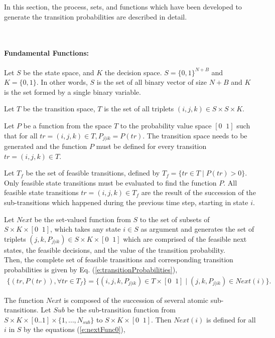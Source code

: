 \documentclass[letterpaper]{article}
\begin{document}
\iffalse
In this section, the process, sets, and functions which have been developed to generate the transition probabilities are described in detail.


\\

\paragraph{Fundamental Functions:}

Let $S$ be the state space, and $K$ the decision space. $S = \{0,1\}^{N+B}$ and $K = \{0,1\}$. In other words, $S$ is the set of all binary vector of size $N+B$ and $K$ is the set formed by a single binary variable.

Let $T$ be the transition space, $T$ is the set of all triplets $(i,j,k) \in S\times S \times K$.

Let $P$ be a function from the space $T$ to the probability value space $[0\;\;1]$ such that for all $tr=(i,j,k) \in T, P_{j|ik} = P(tr)$.
The transition space needs to be generated and the function $P$ must be defined for every transition $tr=(i,j,k) \in T$.

Let $T_f$ be the set of feasible transitions, defined by $T_f = \{tr \in T \mid P(tr)>0\}$. Only feasible state transitions must be evaluated to find the function $P$. All feasible state transitions $tr=(i,j,k) \in T_f$ are the result of the succession of the sub-transitions which happened during the previous time step, starting in state $i$.

Let $Next$ be the set-valued function from $S$ to the set of subsets of $S \times K \times [0 \;\; 1]$, which takes any state $i \in S$ as argument and 
generates the set of triplets $(j,k,P_{j|ik}) \in S \times K \times [0 \;\; 1]$  which are comprised of the feasible next states,
 the feasible decisions, and the value of the transition probability.\\

Then, the complete set of feasible transitions and corresponding transition probabilities is given by Eq. (\ref{e:transitionProbabilities}),
\begin{eqnarray}
  \label{e:transitionProbabilities}
 \{(tr,P(tr)), \forall tr \in T_f\} = \{(i,j,k,P_{j|ik}) \in T \times [0\;\;1] \mid  (j,k,P_{j|ik}) \in Next(i)\}.
\end{eqnarray}

The function $Next$ is composed of the succession of several atomic sub-transitions. Let $Sub$ be the sub-transition function from $S \times K \times [0..1] \times \{1,\ldots,N_{sub}\}$ to $S \times K \times [0\;\;1]$.
Then $Next(i)$ is defined for all $i$ in $S$ by the equations (\ref{e:nextFunc0}),
\end{document}

